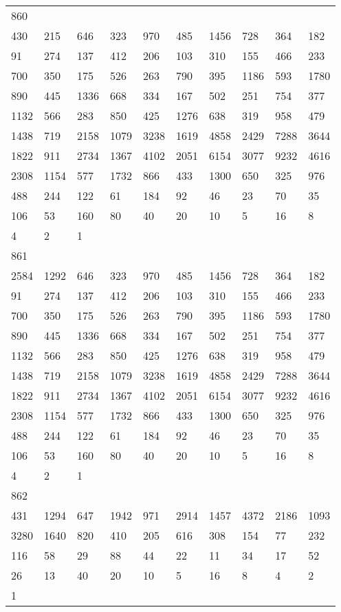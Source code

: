 \begin{longtable}{*{10}{l}}
860&&&&&&&&&\\
430& 215& 646& 323& 970& 485& 1456& 728& 364& 182\\
91& 274& 137& 412& 206& 103& 310& 155& 466& 233\\
700& 350& 175& 526& 263& 790& 395& 1186& 593& 1780\\
890& 445& 1336& 668& 334& 167& 502& 251& 754& 377\\
1132& 566& 283& 850& 425& 1276& 638& 319& 958& 479\\
1438& 719& 2158& 1079& 3238& 1619& 4858& 2429& 7288& 3644\\
1822& 911& 2734& 1367& 4102& 2051& 6154& 3077& 9232& 4616\\
2308& 1154& 577& 1732& 866& 433& 1300& 650& 325& 976\\
488& 244& 122& 61& 184& 92& 46& 23& 70& 35\\
106& 53& 160& 80& 40& 20& 10& 5& 16& 8\\
4& 2& 1& \\

861&&&&&&&&&\\
2584& 1292& 646& 323& 970& 485& 1456& 728& 364& 182\\
91& 274& 137& 412& 206& 103& 310& 155& 466& 233\\
700& 350& 175& 526& 263& 790& 395& 1186& 593& 1780\\
890& 445& 1336& 668& 334& 167& 502& 251& 754& 377\\
1132& 566& 283& 850& 425& 1276& 638& 319& 958& 479\\
1438& 719& 2158& 1079& 3238& 1619& 4858& 2429& 7288& 3644\\
1822& 911& 2734& 1367& 4102& 2051& 6154& 3077& 9232& 4616\\
2308& 1154& 577& 1732& 866& 433& 1300& 650& 325& 976\\
488& 244& 122& 61& 184& 92& 46& 23& 70& 35\\
106& 53& 160& 80& 40& 20& 10& 5& 16& 8\\
4& 2& 1& \\

862&&&&&&&&&\\
431& 1294& 647& 1942& 971& 2914& 1457& 4372& 2186& 1093\\
3280& 1640& 820& 410& 205& 616& 308& 154& 77& 232\\
116& 58& 29& 88& 44& 22& 11& 34& 17& 52\\
26& 13& 40& 20& 10& 5& 16& 8& 4& 2\\
1& \\


\end{longtable}
